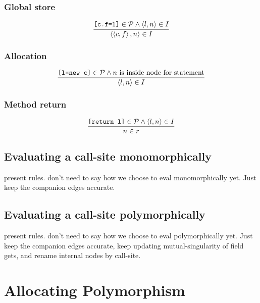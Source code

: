 \documentclass[11pt,notitlepage]{article}
\begin{document}
\subsubsection{Global store}

\begin{displaymath}
\dfrac
{\text{\tt [c.f=l]}\in\mathcal{P} \wedge
 \left\langle l,n \right\rangle\in I}
{\left\langle \left\langle c,f \right\rangle,n \right\rangle\in I}
\end{displaymath}

\subsubsection{Allocation}

\begin{displaymath}
\dfrac
{\text{\tt [l=new c]}\in\mathcal{P} \wedge
 n \text{ is inside node for statement} }
{\left\langle l,n \right\rangle\in I}
\end{displaymath}

\subsubsection{Method return}

\begin{displaymath}
\dfrac
{\text{\tt [return l]}\in\mathcal{P} \wedge
 \left\langle l,n \right\rangle\in I}
{n\in r}
\end{displaymath}


\subsection{Evaluating a call-site monomorphically}

present rules.  don't need to say how we choose to eval
monomorphically yet.  Just keep the companion edges accurate.

\subsection{Evaluating a call-site polymorphically}

present rules.  don't need to say how we choose to eval
polymorphically yet.  Just keep the companion edges accurate,
keep updating mutual-singularity of field gets,
and rename internal nodes by call-site.

\section{Allocating Polymorphism}
\end{document}
